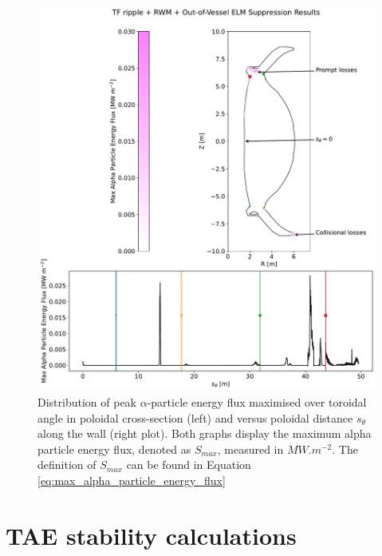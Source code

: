 \documentclass[10pt, a4paper, twoside]{article}
\begin{document}
\begin{figure}
    \centering
    \includegraphics[width=0.99\linewidth]{Figures/energy_flux_full_3d.pdf}
    \caption{Distribution of peak $\alpha$-particle energy flux maximised over toroidal angle in poloidal cross-section (left) and versus poloidal distance $s_\theta$ along the wall (right plot). Both graphs display the maximum alpha particle energy flux, denoted as $S_{max}$, measured in $\si{MW.m^{-2}}$. The definition of $S_{max}$ can be found in Equation \eqref{eq:max_alpha_particle_energy_flux}}
    \label{fig:energy_flux_full_3d}
\end{figure}

\newpage
\section{TAE stability calculations}
\label{sec:halo_work}
\end{document}
